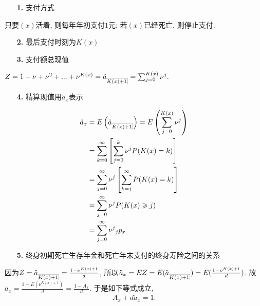 \documentclass[a4paper,openany, 10pt]{ctexbook}
\makeatletter
\newcommand{\hei}{\CJKfamily{hei}}      %
\def\z{\left}
\def\y{\right}
\DeclareRobustCommand{\annu}[1]{_{%
    \def\arraystretch{0}%
    \setlength\arraycolsep{1pt}%
    \setlength\arrayrulewidth{.2pt}%
    \begin{array}[b]{@{}c|}\hline
        \\[\arraycolsep]%
        \scriptstyle #1%
    \end{array}%
}}
\makeatother
\begin{document}
\begin{itemize}
    \item[{\bf\hei 1.}]支付方式
\end{itemize}

只要$(x)$活着, 则每年年初支付$1$元; 若$(x)$已经死亡, 则停止支付.

\begin{itemize}
    \item[{\bf\hei 2.}]最后支付时刻为$K(x)$
\end{itemize}

\begin{itemize}
    \item[{\bf\hei 3.}]支付额总现值
\end{itemize}

$Z=1+\nu+\nu^2+...+\nu^{K(x)}=\ddot a_{\annu {K(x)+1}}=\sum_{j=0}^{K\left( x \right)}{\nu^j}.$

\begin{itemize}
    \item[{\bf\hei 4.}]精算现值用$\ddot a_x$表示
\end{itemize}
\begin{align*}
    \ddot a_x & =E\z(\ddot a_{\annu {K(x)+1}}\y)=E\z(\sum_{j=0}^{K\left( x \right)}{\nu^j}\y) \\
              & = \sum_{k=0}^{\infty}\z[\sum_{j=0}^{k}{\nu^j}P(K(x) = k)\y]               \\
              & = \sum_{j=0}^{\infty}\nu^j\z[\sum_{k=j}^{\infty}P(K(x) = k)\y]            \\
              & =\sum_{j=0}^{\infty}{\nu^j}P(K(x) \geqslant j)                        \\
              & =\sum_{j=0}^{\infty}{\nu^j}{}_jp_x                                   \\
\end{align*}




\begin{itemize}
    \item[{\bf\hei 5.}]终身初期死亡生存年金和死亡年末支付的终身寿险之间的关系
\end{itemize}

因为$Z=\ddot a_{\annu {K(x)+1}}=\frac{1-\nu^{K(x)+1}}{d}$, 所以$\ddot a_x=EZ=E(\ddot a_{\annu {K(x)+1}})=E(\frac{1-\nu^{K(x)+1}}{d})$. 故$\ddot a_{x}=\frac{1-E(\nu^{K(x)+1})}{d}=\frac{1-A_x}{d}$.
于是如下等式成立,
\begin{align*}
    A_x+d \ddot a_x=1.
\end{align*}
\end{document}
